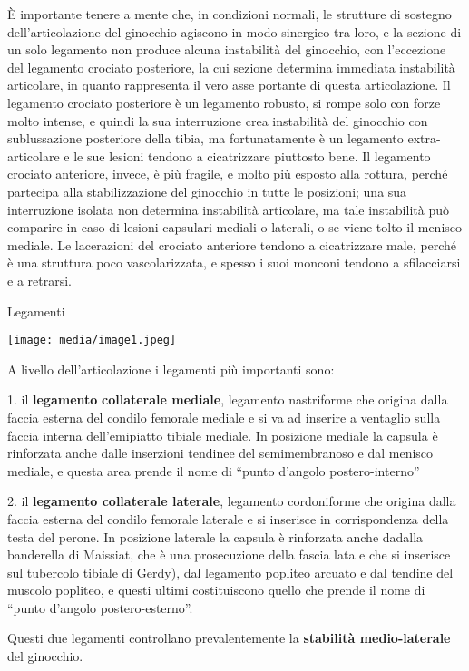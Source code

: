 \documentclass[]{article}
\begin{document}
È importante tenere a mente che, in condizioni normali, le strutture di
sostegno dell'articolazione del ginocchio agiscono in modo sinergico tra
loro, e la sezione di un solo legamento non produce alcuna instabilità
del ginocchio, con l'eccezione del legamento crociato posteriore, la cui
sezione determina immediata instabilità articolare, in quanto
rappresenta il vero asse portante di questa articolazione. Il legamento
crociato posteriore è un legamento robusto, si rompe solo con forze
molto intense, e quindi la sua interruzione crea instabilità del
ginocchio con sublussazione posteriore della tibia, ma fortunatamente è
un legamento extra-articolare e le sue lesioni tendono a cicatrizzare
piuttosto bene. Il legamento crociato anteriore, invece, è più fragile,
e molto più esposto alla rottura, perché partecipa alla stabilizzazione
del ginocchio in tutte le posizioni; una sua interruzione isolata non
determina instabilità articolare, ma tale instabilità può comparire in
caso di lesioni capsulari mediali o laterali, o se viene tolto il
menisco mediale. Le lacerazioni del crociato anteriore tendono a
cicatrizzare male, perché è una struttura poco vascolarizzata, e spesso
i suoi monconi tendono a sfilacciarsi e a retrarsi.

Legamenti

\texttt{[image: media/image1.jpeg]}

A livello dell'articolazione i legamenti più importanti sono:

1. il \textbf{legamento} \textbf{collaterale mediale}, legamento
nastriforme che origina dalla faccia esterna del condilo femorale
mediale e si va ad inserire a ventaglio sulla faccia interna
dell'emipiatto tibiale mediale. In posizione mediale la capsula è
rinforzata anche dalle inserzioni tendinee del semimembranoso e dal
menisco mediale, e questa area prende il nome di ``punto d'angolo
postero-interno''

2. il \textbf{legamento collaterale laterale}, legamento cordoniforme
che origina dalla faccia esterna del condilo femorale laterale e si
inserisce in corrispondenza della testa del perone. In posizione
laterale la capsula è rinforzata anche dadalla banderella di Maissiat,
che è una prosecuzione della fascia lata e che si inserisce sul
tubercolo tibiale di Gerdy), dal legamento popliteo arcuato e dal
tendine del muscolo popliteo, e questi ultimi costituiscono quello che
prende il nome di ``punto d'angolo postero-esterno''.

Questi due legamenti controllano prevalentemente la \textbf{stabilità
medio-laterale} del ginocchio.
\end{document}
